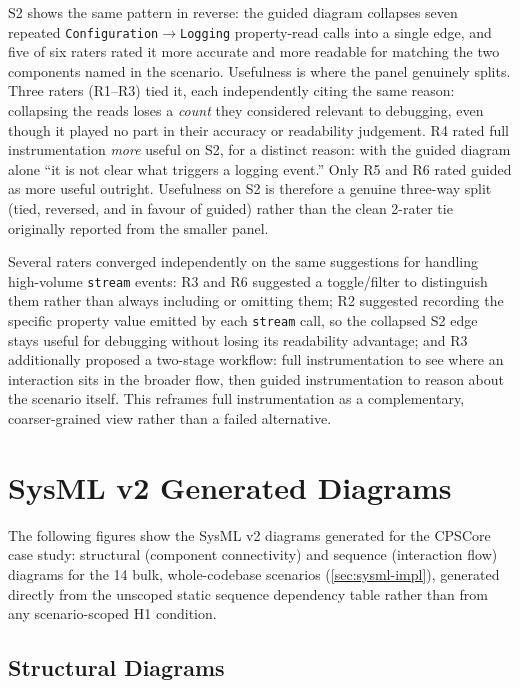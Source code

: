 S2 shows the same pattern in reverse: the guided diagram collapses seven
repeated \texttt{Configuration}$\to$\texttt{Logging} property-read calls
into a single edge, and five of six raters
rated it more accurate and more readable for matching the two components
named in the scenario. Usefulness is where the panel genuinely splits.
Three raters (R1--R3) tied it, each independently citing the same
reason: collapsing the reads loses a \emph{count} they considered
relevant to debugging, even though it played no part in their accuracy
or readability judgement. R4 rated full instrumentation \emph{more}
useful on S2, for a distinct reason: with the guided diagram alone ``it
is not clear what triggers a logging event.'' Only R5 and R6 rated
guided as more useful outright. Usefulness on S2 is therefore a genuine
three-way split (tied, reversed, and in favour of guided) rather than
the clean 2-rater tie originally reported from the smaller panel.

Several raters converged independently on the same suggestions for
handling high-volume \texttt{stream} events: R3 and R6 suggested a
toggle/filter to distinguish them rather than always including or
omitting them; R2 suggested recording the specific property value
emitted by each \texttt{stream} call, so the collapsed S2 edge stays
useful for debugging without losing its readability advantage; and R3
additionally proposed a two-stage workflow: full instrumentation to see
where an interaction sits in the broader flow, then guided
instrumentation to reason about the scenario itself. This reframes full
instrumentation as a complementary, coarser-grained view rather than a
failed alternative.

\section{SysML v2 Generated Diagrams}
\label{sec:appendix-sysmlv2}

The following figures show the SysML v2 diagrams generated for the
CPSCore case study: structural (component connectivity) and sequence
(interaction flow) diagrams for the 14 bulk, whole-codebase scenarios
(\cref{sec:sysml-impl}), generated directly from the unscoped static
sequence dependency table rather than from any scenario-scoped H1
condition.

\subsection{Structural Diagrams}

